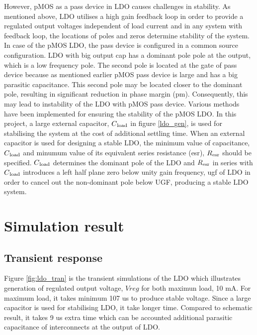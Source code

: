 \documentclass[UKenglish]{ifimaster}  %
\begin{document}
However, pMOS as a pass device in LDO causes challenges in stability. As mentioned above, LDO utilises a high 
gain feedback loop in order to provide a regulated output voltages independent of load current and in any system 
with feedback loop, the locations of poles and zeros determine stability of the system.  In case of the pMOS LDO, 
the pass device is configured in a common source configuration. LDO with big output cap has a dominant pole pole 
at the output, which is a low frequency pole. The second pole is located at the gate of pass device because as 
mentioned earlier pMOS pass device is large and has a big parasitic capacitance. This second pole may be located 
closer to the dominant pole, resulting in significant  reduction in phase margin (\acrshort{pm}). Consequently, 
this may lead to instability of the LDO with pMOS pass device.  Various methods have been implemented for 
ensuring the stability of the pMOS LDO. In this project, a large external capacitor, $C\textsubscript{load}$ in 
figure \ref{ldo_gen}, is used for stabilising the system at the cost of additional settling time. When an 
external capacitor is used for designing a stable LDO, the minimum value of capacitance, $C\textsubscript{load}$ 
and minumum value of its equivalent series resistance (\acrshort{esr}), $R\textsubscript{esr}$ should be 
specified\cite{ldo_ti_stability}. $C\textsubscript{load}$ determines the dominant pole of the LDO and 
$R\textsubscript{esr}$ in series with $C\textsubscript{load}$ introduces a left half plane zero below unity 
gain frequency, \acrshort{ugf} of LDO in order to cancel out the non-dominant pole below UGF, producing a 
stable LDO system. \\

\section{Simulation result}

\subsection{Transient response}	%

Figure \ref{fig:ldo_tran} is the transient simulations of the LDO which illustrates generation of  regulated output voltage, $Vreg$ for 
both maximun load, 10 mA. For maximum load, it takes minimum 107 us to produce stable voltage. Since a large capacitor is used for stabilising 
LDO, it take longer time. Compared to schematic result, it takes 9 us extra time which can be accounted additional parasitic capacitance of interconnects 
at the output of LDO.\\
\end{document}
